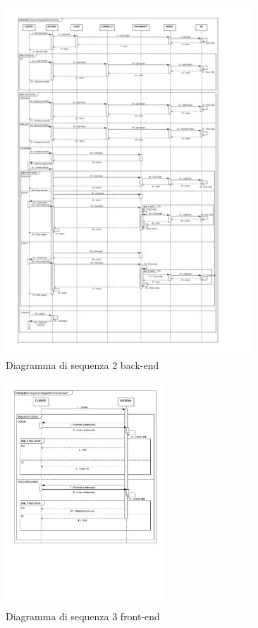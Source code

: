 \documentclass[a4paper,titlepage]{book}
\begin{document}
\begin{figure}[H]
\center
\includegraphics[width=350px]{img/Seq2B.pdf}
\caption{Diagramma di sequenza 2 back-end \label{fig:seq2b}}
\end{figure}
\begin{figure}[H]
\center
\includegraphics[width=225px]{img/Seq3F.pdf}
\caption{Diagramma di sequenza 3 front-end \label{fig:seq3f}}
\end{figure}
\end{document}
